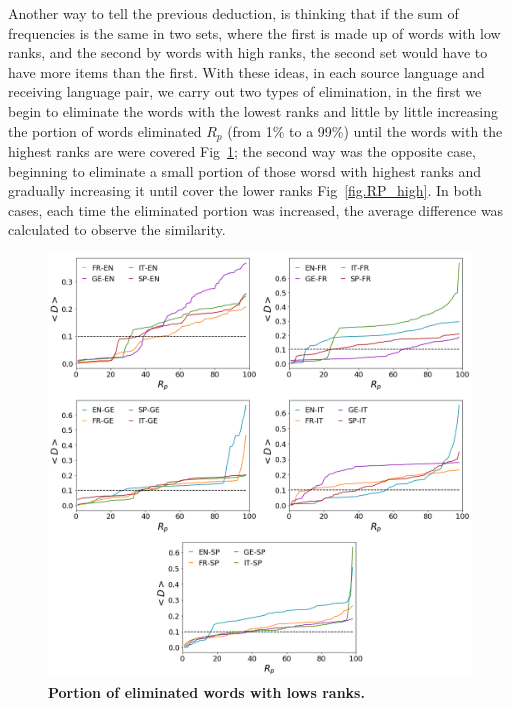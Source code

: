 \documentclass[10pt,letterpaper]{article} %
\begin{document}
Another way to tell the previous deduction, is thinking that if the sum of frequencies is the same in two sets, where the first is made up of words with low ranks, and the second by words with high ranks, the second set would have to have more items than the first. With these ideas, in each source language and receiving language pair, we carry out two types of elimination, in the first we begin to eliminate the words with the lowest ranks and little by little increasing the portion of words eliminated $R_{p}$ (from 1$\%$ to a 99$\%$) until the words with the highest ranks are
were covered Fig~\ref{fig.RP_low}; the second way was the opposite case, beginning to eliminate a small portion of those worsd with highest ranks and gradually increasing it until cover the lower ranks Fig~\ref{fig.RP_high}. In both cases, each time the eliminated portion was increased, the average difference was calculated to observe the similarity.


\begin{figure}[!h]
	\begin{adjustwidth}{-2.5cm}{1cm}
		\centering
		\includegraphics[scale=.38]{Rp_bajos.png}
		\caption{{\bf Portion of eliminated words with lows ranks.} }
		\label{fig.RP_low}
	\end{adjustwidth}
\end{figure}
\end{document}
